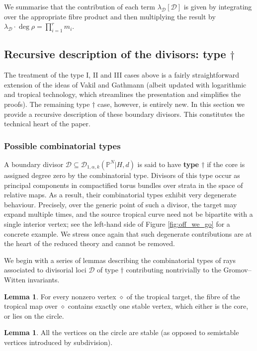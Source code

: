 \documentclass[11pt]{amsart}
\newcommand{\PP}{\mathbb P}
\newcommand{\Dcal}{\mathcal{D}}
\theoremstyle{definition}
\newtheorem{lemma}[thm]{Lemma}
\theoremstyle{definition}
\begin{document}
We summarise that the contribution of each term $\lambda_\Dcal [\Dcal]$ is given by integrating over the appropriate fibre product and then multiplying the result by $\lambda_\Dcal \cdot \deg\rho = \prod_{i=1}^r m_i$.

\subsection{Recursive description of the divisors: type $\dag$}\label{subsection C0 splitting} The treatment of the type I, II and III cases above is a fairly straightforward extension of the ideas of Vakil and Gathmann (albeit updated with logarithmic and tropical technology, which streamlines the presentation and simplifies the proofs). The remaining type $\dag$ case, however, is entirely new. In this section we provide a recursive description of these boundary divisors. This constitutes the technical heart of the paper.

\subsubsection{Possible combinatorial types}\label{S:combinatorialdescription} A boundary divisor $\Dcal \subseteq \Dcal_{1,\alpha,k}(\PP^N|H,d)$ is said to have \textbf{type $\dag$} if the core is assigned degree zero by the combinatorial type. Divisors of this type occur as principal components in compactified torus bundles over strata in the space of relative maps. As a result, their combinatorial types exhibit very degenerate behaviour. Precisely, over the generic point of such a divisor, the target may expand multiple times, and the source tropical curve need not be bipartite with a single interior vertex; see the left-hand side of Figure \ref{fig:off_we_go} for a concrete example. We stress once again that such degenerate contributions are at the heart of the reduced theory and cannot be removed.

We begin with a series of lemmas describing the combinatorial types of rays associated to divisorial loci $\Dcal$ of type $\dag$ contributing nontrivially to the Gromov--Witten invariants.
\begin{lemma} \label{lemma type C0 combinatorial types}
 For every nonzero vertex $\diamond$ of the tropical target, the fibre of the tropical map over $\diamond$ contains exactly one stable vertex, which either is the core, or lies on the circle.
\end{lemma}

\begin{lemma}\label{lem:stable_vertices} All the vertices on the circle are stable (as opposed to semistable  vertices introduced by subdivision). \end{lemma}
\end{document}
